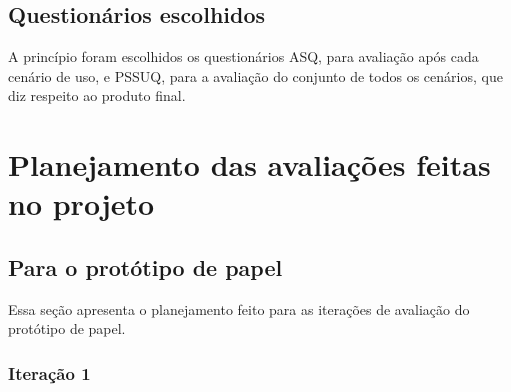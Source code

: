     \subsection{Questionários escolhidos}

      A princípio foram escolhidos os questionários ASQ, para avaliação após cada cenário de uso, e PSSUQ, para a avaliação
      do conjunto de todos os cenários, que diz respeito ao produto final.
    
    \vfill
    
    \pagebreak
    \section{Planejamento das avaliações feitas no projeto}
      
      \subsection{Para o protótipo de papel}
      
	Essa seção apresenta o planejamento feito para as iterações de avaliação do protótipo de papel.
      
	\subsubsection{Iteração 1}
	  

